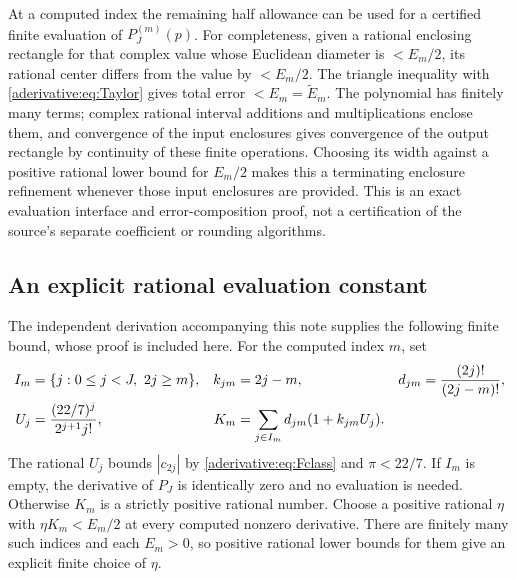 \documentclass[11pt]{article}
\begin{document}
At a computed index the remaining half allowance can be used
for a certified finite evaluation of $P_J^{(m)}(p)$.
For completeness, given a rational enclosing rectangle for
that complex value whose Euclidean diameter is $<E_m/2$,
its rational center differs from the value by $<E_m/2$.
The triangle inequality with \eqref{aderivative:eq:Taylor} gives total
error $<E_m=\widetilde E_m$. The polynomial has finitely
many terms; complex rational interval additions and
multiplications enclose them, and convergence of the input
enclosures gives convergence of the output rectangle by
continuity of these finite operations. Choosing its width
against a positive rational lower bound for $E_m/2$ makes
this a terminating enclosure refinement whenever those
input enclosures are provided. This is an exact evaluation
interface and error-composition proof, not a certification
of the source's separate coefficient or rounding algorithms.

\subsection{An explicit rational evaluation constant}
\label{aderivative:sec:evaluation}
The independent derivation accompanying this note supplies
the following finite bound, whose proof is included here.
For the computed index $m$, set
\begin{align}
I_m&=\{j:0\le j<J,\ 2j\ge m\},&
k_{jm}&=2j-m,& d_{jm}&=\frac{(2j)!}{(2j-m)!},\notag\\
U_j&=\frac{(22/7)^j}{2^{j+1}j!},&
K_m&=\sum_{j\in I_m}d_{jm}(1+k_{jm}U_j).
\label{aderivative:eq:Km}
\end{align}
The rational $U_j$ bounds $|c_{2j}|$ by \eqref{aderivative:eq:Fclass}
and $\pi<22/7$. If $I_m$ is empty, the derivative of $P_J$
is identically zero and no evaluation is needed. Otherwise
$K_m$ is a strictly positive rational number. Choose a
positive rational $\eta$ with $\eta K_m<E_m/2$ at every
computed nonzero derivative. There are finitely many such
indices and each $E_m>0$, so positive rational lower bounds
for them give an explicit finite choice of $\eta$.
\end{document}
